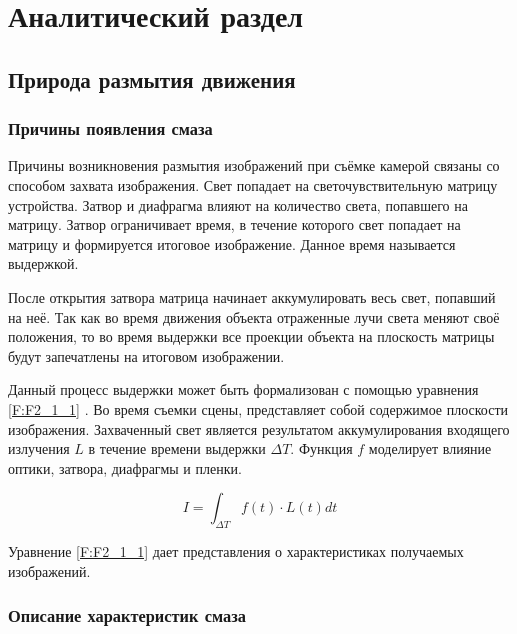 \chapter{Аналитический раздел}
\label{cha:analysis}
%
%

\section{Природа размытия движения}

\subsection{Причины появления смаза}

Причины возникновения размытия изображений при съёмке камерой связаны со способом захвата изображения. Свет попадает на светочувствительную матрицу устройства. Затвор и диафрагма влияют на количество света, попавшего на матрицу. Затвор ограничивает время, в течение которого свет попадает на матрицу и формируется итоговое изображение. Данное время называется выдержкой.
\par
После открытия затвора матрица начинает аккумулировать весь свет, попавший на неё. Так как во время движения объекта отраженные лучи света меняют своё положения, то во время выдержки все проекции объекта на плоскость матрицы будут запечатлены на итоговом изображении.    
\par
Данный процесс выдержки может быть формализован с помощью уравнения \eqref{F:F2_1_1} . Во время съемки сцены,  представляет собой содержимое плоскости изображения. Захваченный свет является результатом аккумулирования входящего излучения $L$ в течение времени выдержки $\Delta T$. Функция $f$ моделирует влияние оптики, затвора, диафрагмы и пленки.
\par
\begin{equation}
    I = \int_{\Delta T} f(t) \cdot L(t) dt
    \label{F:F2_1_1}
\end{equation}
\par
Уравнение \eqref{F:F2_1_1} дает представления о характеристиках получаемых изображений. \cite{Navarro11}

\subsection{Описание характеристик смаза}

